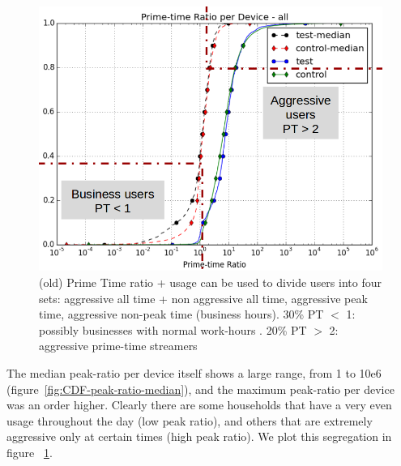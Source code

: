 \begin{figure}[ht!]
\begin{minipage}{0.9\linewidth}
\centering
\includegraphics[width=0.9\linewidth]{figures/cdf-prime-time-ratio[replace].png}
\caption{(old) Prime Time ratio + usage can be used to divide users into four sets: aggressive all time + non aggressive all time, aggressive peak time, aggressive non-peak time (business hours). 30\% PT $<$ 1: possibly businesses with normal work-hours . 20\% PT $>$ 2: aggressive prime-time streamers}
\label{fig:CDF-prime-time-ratio}
\end{minipage}
\end{figure}

The median peak-ratio per device itself shows a large range, from 1 to 10e6 (figure~\ref{fig:CDF-peak-ratio-median}), and the maximum peak-ratio per device was an order higher. Clearly there are some households that have a very even usage throughout the day (low peak ratio), and others that are extremely aggressive only at certain times (high peak ratio). We plot this segregation in figure ~\ref{fig:CDF-prime-time-ratio}.


